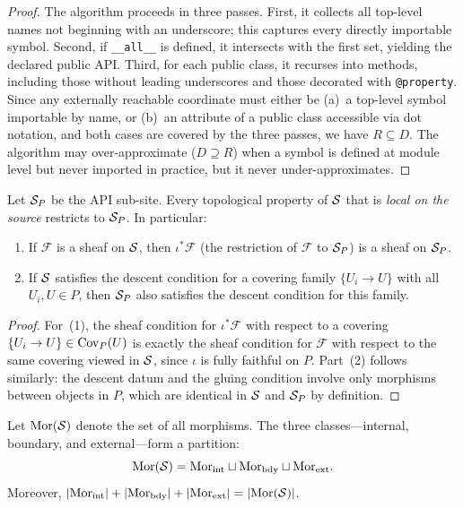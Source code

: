 \documentclass[11pt]{article}
\begin{document}
\begin{proof}
The algorithm proceeds in three passes.  First, it collects all
top-level names not beginning with an underscore; this captures every
directly importable symbol.  Second, if \texttt{\_\_all\_\_} is defined,
it intersects with the first set, yielding the declared public API.
Third, for each public class, it recurses into methods, including those
without leading underscores and those decorated with
\texttt{@property}.  Since any externally reachable coordinate must
either be (a)~a top-level symbol importable by name, or (b)~an
attribute of a public class accessible via dot notation, and both cases
are covered by the three passes, we have $R \subseteq D$.  The
algorithm may over-approximate ($D \supseteq R$) when a symbol is
defined at module level but never imported in practice, but it never
under-approximates.
\end{proof}

\begin{lemma}\label{lem:subsite-inherit}
Let $\mathcal{S}_P$ be the API sub-site.  Every topological property of $\mathcal{S}$
that is \emph{local on the source} restricts to $\mathcal{S}_P$.  In
particular:
\begin{enumerate}[noitemsep]
  \item If $\mathcal{F}$ is a sheaf on $\mathcal{S}$, then $\iota^{*}\mathcal{F}$
        (the restriction of $\mathcal{F}$ to $\mathcal{S}_P$) is a sheaf on $\mathcal{S}_P$.
  \item If $\mathcal{S}$ satisfies the descent condition for a covering family
        $\{U_i \to U\}$ with all $U_i, U \in P$, then $\mathcal{S}_P$ also
        satisfies the descent condition for this family.
\end{enumerate}
\end{lemma}

\begin{proof}
For~(1), the sheaf condition for $\iota^{*}\mathcal{F}$ with respect to
a covering $\{U_i \to U\} \in \mathrm{Cov}_P(U)$ is exactly the sheaf
condition for $\mathcal{F}$ with respect to the same covering viewed in
$\mathcal{S}$, since $\iota$ is fully faithful on $P$.  Part~(2) follows
similarly: the descent datum and the gluing condition involve only
morphisms between objects in $P$, which are identical in $\mathcal{S}$ and
$\mathcal{S}_P$ by definition.
\end{proof}

\begin{proposition}\label{prop:morph-exhaust}
Let $\mathrm{Mor}(\mathcal{S})$ denote the set of all morphisms.  The three classes---internal,
boundary, and external---form a partition:
\[
  \mathrm{Mor}(\mathcal{S}) = \mathrm{Mor}_{\mathrm{int}} \sqcup \mathrm{Mor}_{\mathrm{bdy}} \sqcup \mathrm{Mor}_{\mathrm{ext}}.
\]
Moreover, $|\mathrm{Mor}_{\mathrm{int}}| + |\mathrm{Mor}_{\mathrm{bdy}}| + |\mathrm{Mor}_{\mathrm{ext}}| = |\mathrm{Mor}(\mathcal{S})|$.
\end{proposition}
\end{document}
